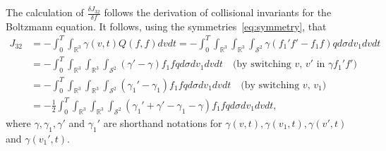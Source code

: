 \documentclass[times,final,nopreprintline]{elsarticle}
\newcommand{\bbR}{\mathbb R} \newcommand{\bbS}{\mathbb S}
\newcommand{\cS}{\mathcal S} \newcommand{\cT}{\mathcal T}
\newcommand{\Rthree}{{\bbR^3}}
\newcommand{\Stwo}{{\cS^2}}
\begin{document}
The calculation of $ \frac{\delta J_{32} }{ \delta f} $ follows the derivation of collisional invariants for the Boltzmann equation\cite{cercignani1988boltzmann}. 
It follows, using the symmetries~\eqref{eq:symmetry}, that
\begin{align*}
J_{32}&=- \int_0^T \int_\Rthree \gamma(v,t)  Q(f,f)   dv dt = -\int_0^T \int_\Rthree \int_\Rthree \int_\Stwo  \gamma  (f_1' f' - f_1 f) q  d\sigma dv_1 dv dt  \nonumber \\
&=- \int_0^T \int_\Rthree \int_\Rthree \int_\Stwo  (  \gamma' - \gamma )   f_1 f q  d\sigma dv_1 dv dt \quad \mbox{(by switching $v$, $v'$ in $\gamma  f_1' f' $)} \nonumber  \\
&=-  \int_0^T \int_\Rthree \int_\Rthree \int_\Stwo  (  \gamma_1' - \gamma_1 )   f_1 f q  d\sigma dv_1 dv dt \quad \mbox{(by switching $v$, $v_1$)}  \nonumber \\
&=-\frac{1}{2}  \int_0^T  \int_\Rthree \int_\Rthree \int_\Stwo (  \gamma_1' + \gamma' - \gamma_1 - \gamma)   f_1 f q  d\sigma dv_1 dv dt, %
\end{align*}
where $\gamma,\gamma_1,\gamma'$ and $\gamma_1'$ are shorthand notations for $\gamma(v,t),\gamma(v_1,t),\gamma(v',t)$ and $\gamma(v_1',t)$.
\end{document}
